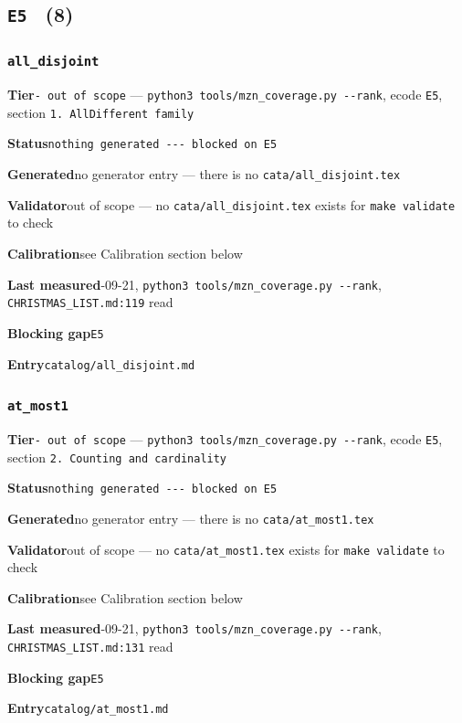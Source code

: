\documentclass[10pt,a4paper]{article}
\newcommand{\entryfield}[2]{{\raggedright\textbf{#1}\quad #2\par}}
\begin{document}
\subsection*{\texttt{E5} \ \normalsize(8)}
\subsubsection*{\texttt{all\_\allowbreak{}disjoint}}
\label{entry:all-disjoint}
\entryfield{Tier}{\texttt{- out of scope} --- \texttt{python3 tools/\allowbreak{}mzn\_\allowbreak{}coverage.\allowbreak{}py -\allowbreak{}-\allowbreak{}rank}, ecode \texttt{E5}, section \texttt{1. AllDifferent family}}
\entryfield{Status}{\texttt{nothing generated -\allowbreak{}-\allowbreak{}-\allowbreak{} blocked on E5}}
\entryfield{Generated}{no generator entry --- there is no \texttt{cata/all\_disjoint.tex}}
\entryfield{Validator}{out of scope --- no \texttt{cata/all\_disjoint.tex} exists for \texttt{make validate} to check}
\entryfield{Calibration}{see Calibration section below}
\entryfield{Last measured}{2026-09-21, \texttt{python3 tools/\allowbreak{}mzn\_\allowbreak{}coverage.\allowbreak{}py -\allowbreak{}-\allowbreak{}rank}, \texttt{CHRISTMAS\_LIST.md:119} read}
\entryfield{Blocking gap}{\texttt{E5}}
\entryfield{Entry}{\texttt{catalog/all\_disjoint.md}}
\subsubsection*{\texttt{at\_\allowbreak{}most1}}
\label{entry:at-most1}
\entryfield{Tier}{\texttt{- out of scope} --- \texttt{python3 tools/\allowbreak{}mzn\_\allowbreak{}coverage.\allowbreak{}py -\allowbreak{}-\allowbreak{}rank}, ecode \texttt{E5}, section \texttt{2.\allowbreak{} Counting and cardinality}}
\entryfield{Status}{\texttt{nothing generated -\allowbreak{}-\allowbreak{}-\allowbreak{} blocked on E5}}
\entryfield{Generated}{no generator entry --- there is no \texttt{cata/at\_most1.tex}}
\entryfield{Validator}{out of scope --- no \texttt{cata/at\_most1.tex} exists for \texttt{make validate} to check}
\entryfield{Calibration}{see Calibration section below}
\entryfield{Last measured}{2026-09-21, \texttt{python3 tools/\allowbreak{}mzn\_\allowbreak{}coverage.\allowbreak{}py -\allowbreak{}-\allowbreak{}rank}, \texttt{CHRISTMAS\_LIST.md:131} read}
\entryfield{Blocking gap}{\texttt{E5}}
\entryfield{Entry}{\texttt{catalog/at\_most1.md}}
\end{document}
